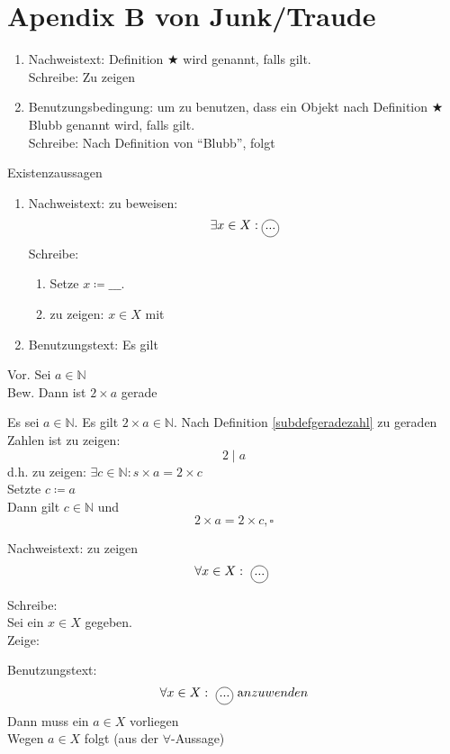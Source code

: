 \documentclass{gadsescript}
\begin{document}
\section{Apendix B von Junk/Traude}
\begin{definition}
	\label{def:B.10}
	\begin{enumerate}[label=]
		\item Nachweistext: Definition $\bigstar$ wird  genannt, falls  gilt.\\
			Schreibe: Zu zeigen 
		\item Benutzungsbedingung: um zu benutzen, dass ein Objekt nach Definition $\bigstar$ Blubb genannt wird, falls  gilt.\\
			Schreibe: Nach Definition von ``Blubb'', folgt 
	\end{enumerate}
	 Existenzaussagen
	\begin{enumerate}[label=]
		\item Nachweistext: zu beweisen:
			\[ \exists x \in X : \circled{\text{...}} \]
			Schreibe:
			\begin{enumerate}[label=]
				\item Setze $x \coloneqq \_ \_ \_$.
				\item zu zeigen: $ x \in X$ mit 
			\end{enumerate}
		\item Benutzungstext: Es gilt
	\end{enumerate}
	\begin{example}
		Vor. Sei $a \in \mathbb{N}$\\
		Bew. Dann ist $2 \times a$ gerade\par
		Es sei $a \in \mathbb{N}$. Es gilt $2 \times a \in \mathbb{N}$. Nach Definition \ref{subdefgeradezahl} zu geraden Zahlen ist zu zeigen:
		\[ 2 \mid a \]
		d.h. zu zeigen: $ \exists c \in \mathbb{N} : s \times a = 2 \times c $\\
		Setzte $ c \coloneqq a $\\
		Dann gilt $ c \in \mathbb{N} $ und
		\[ 2 \times a = 2 \times c, \square \]
	\end{example}
\end{definition}

\begin{definition}
	\label{def:B.6}
	Nachweistext: zu zeigen
	\[ \forall x \in X : \text{\circled{...}} \]
	\begin{indentpar}
		\indent Schreibe:\\
		Sei ein $ x \in X $ gegeben.\\
		Zeige: 
	\end{indentpar}
	Benutzungstext:
	\begin{equation}
		\label{B.6.1}
		\forall x \in X : \text{\circled{...}} \text anzuwenden
	\end{equation}
	Dann muss ein $ a \in X $ vorliegen\\
	Wegen $ a \in X $ folgt (aus der $\forall$-Aussage)\\
	\indent{}
\end{definition}
\end{document}
